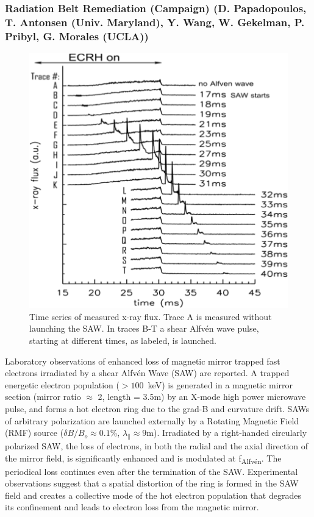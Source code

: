 \documentclass[11pt]{article}
\begin{document}
\subsubsection{Radiation Belt Remediation (Campaign) (D. Papadopoulos,
  T. Antonsen (Univ. Maryland), Y. Wang, W. Gekelman, P. Pribyl, G.
Morales (UCLA))}
\begin{figure}
\begin{center}
\includegraphics[width=3.0truein]{muri1}
\caption{\small Time series of measured x-ray flux.
Trace A is measured without launching the SAW. In traces B-T a
shear Alfv\'{e}n wave pulse, starting at
different times, as labeled, is launched.}\label{muri1}
\end{center}
\end{figure}

Laboratory observations of enhanced loss of magnetic mirror trapped fast
electrons irradiated by a shear Alfv\'{e}n Wave (SAW) are reported. A
trapped energetic electron population ($> 100$~keV) is
generated in a magnetic mirror section (mirror ratio $\approx$ 2,
length = 3.5m) by an X-mode high power microwave pulse, and forms a hot electron
ring due to the grad-B and curvature drift. SAWs of arbitrary
polarization are launched externally by a Rotating Magnetic Field (RMF)
source ($\delta B/B_o \approx 0.1$\%, $\lambda_\parallel \approx 9$m).
Irradiated by a right-handed circularly polarized SAW, the loss of
electrons, in both the radial and the axial direction of the mirror
field, is significantly enhanced and is modulated at
f\textsubscript{Alfv\'{e}n}. The periodical loss continues even after the
termination of the SAW. Experimental observations suggest that a spatial
distortion of the ring is formed in the SAW field and creates a
collective mode of the hot electron population that degrades its
confinement and leads to electron loss from the magnetic mirror.
\end{document}
